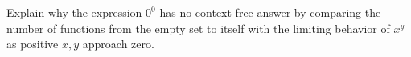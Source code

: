 Explain why the expression $0^0$ has no context-free answer by comparing the number of functions from the empty set to itself with the limiting behavior of $x^y$ as positive $x,y$ approach zero.
